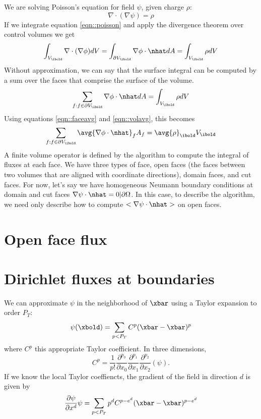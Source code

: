 \documentclass{article}
\begin{document}
We are solving Poisson's equation for field $\psi$, given charge $\rho$:
\begin{equation}
  \nabla \cdot (\nabla \psi) = \rho
  \label{eqn::poisson}
\end{equation}
If we integrate equation \ref{eqn::poisson} and apply the divergence theorem 
over control volumes we get
\begin{equation}
\int_{V_\ibold} \nabla \cdot (\nabla \phi ) dV = \int_{\partial
  V_\ibold} \nabla \phi\cdot \nhat  dA = \int_{V_\ibold} \rho dV
\end{equation}
Without approximation, we can say that the surface integral can be
computed by a sum over the faces that comprise the surface of the
volume.
\begin{equation}
\sum_{f: f \in \partial V_\ibold} \nabla \phi \cdot \nhat dA = \int_{V_\ibold} \rho dV
\end{equation}
Using equations \ref{eqn::faceavg} and \ref{eqn::volavg}, this becomes 
\begin{equation}
\sum_{f: f \in \partial V_\ibold} \avg{\nabla \phi \cdot \nhat}_f A_f
= \avg{\rho}_\ibold V_\ibold
\label{eqn::discretePoisson}
\end{equation}
A finite volume operator is defined by the algorithm to
compute the integral of  fluxes at each face.   We have three types of
face, open faces (the faces between two volumes that are aligned with
coordinate directions), domain  faces, and cut faces.    For now, let's say we have
homogeneous Neumann boundary conditions at domain and cut faces $\nabla \psi
\cdot \nhat  = 0 |\partial \Omega$.   In this case, to describe the
algorithm, we need only describe how to compute $<\nabla \psi \cdot
\nhat>$ on open faces.

\section{Open face flux}
\section{Dirichlet fluxes at boundaries}
We can approximate $\psi$
in the neighborhood of $\xbar$ using a Taylor expansion to order $P_T$:
\begin{equation}
\psi(\xbold)  =  \sum\limits_{p < P_T} C^p (\xbar -\xbar)^p
\label{eqn::taylor}
\end{equation}
where $C^p$ this appropriate Taylor coefficient.  In three dimensions,
\begin{equation}
  C^p =\frac{1}{p!}
      \frac{\partial^{p_0}}{\partial x_0}
      \frac{\partial^{p_1}}{\partial x_1}
      \frac{\partial^{p_2}}{\partial x_2}  (\psi).
\end{equation}
If we know the local Taylor coeffiencts,
the gradient of the field  in direction $d$ is given by
\begin{equation}
  \frac{\partial \psi}{\partial x^d} \psi =
  \sum\limits_{p < P_T} p^d C^{p-e^d} (\xbar -\xbar)^{p-e^d}
\end{equation}
\end{document}
